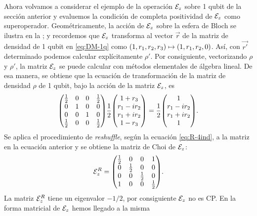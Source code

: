 Ahora volvamos a considerar el ejemplo de la operación $\mathcal{E}_z$ 
sobre 1 qubit de la sección anterior y evaluemos la condición de 
completa positividad de $\mathcal{E}_z$ como superoperador. 
Geométricamente, la acción de $\mathcal{E}_z$ sobre la 
esfera de Bloch se ilustra en la ;
y recordemos que $\mathcal{E}_z$ transforma al vector $\vec{r}$ 
de la matriz de densidad de 1 qubit en \eqref{eq:DM-1q} 
como $\qty(1,r_1,r_2,r_3)\mapsto\qty(1,r_1,r_2,0)$. Así, 
con $\vec{r'}$ determinado podemos calcular 
explícitamente $\rho'$.
Por consiguiente, vectorizando $\rho$ y $\rho'$, la matriz $\mathcal{E}_z$ 
se puede calcular con métodos elementales de álgebra lineal. 
De esa manera, se obtiene que la ecuación de transformación 
de la matriz de densidad $\rho$ de 1 qubit, bajo la
acción de la matriz $\mathcal{E}_z$, es
\begin{align}
\mqty(
\frac{1}{2} & 0 & 0 & \frac{1}{2} \\
0 & 1 & 0 & 0 \\
0 & 0 & 1 & 0 \\
\frac{1}{2} & 0 & 0 & \frac{1}{2} \\
)
\frac{1}{2}
\mqty(
1+r_3\\r_1-ir_2\\r_1+ir_2\\1-r_3
)
=
\frac{1}{2}
\mqty(
1\\r_1-ir_2\\r_1+ir_2\\1
).
\end{align}
Se aplica el procedimiento de \textit{reshuffle},
según la ecuación \eqref{eq:R-4ind}, a la matriz en la ecuación 
anterior y se obtiene la matriz de Choi de $\mathcal{E}_z$:
\begin{align}
\E_z^R=
\mqty(
\frac{1}{2} & 0 & 0 & 1 \\
0 & \frac{1}{2} & 0 & 0 \\
0 & 0 & \frac{1}{2} & 0 \\
1 & 0 & 0 & \frac{1}{2} 
).
\end{align}
La matriz $\mathcal{E}_z^R$ tiene un eigenvalor $-1/2$, 
por consiguiente $\mathcal{E}_z$ no es CP. 
En la forma matricial de $\mathcal{E}_z$ hemos llegado a la misma


